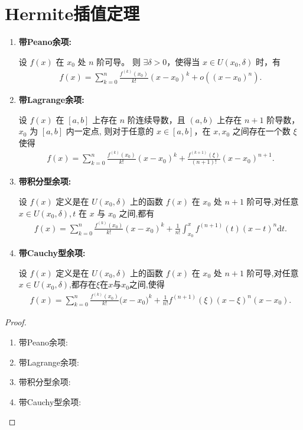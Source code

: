 \documentclass[../../main.tex]{subfiles}
\begin{document}
\section{Hermite插值定理}

\begin{theorem}[Taylor定理]\label{theorem:带各种余项的Taylor公式}
\begin{enumerate}[(1)]
\item \textbf{带Peano余项:}

设 $f(x)$ 在 $x_0$ 处 $n$ 阶可导。
则 $\exists \delta > 0$，使得当 $x \in U(x_0, \delta)$ 时，有
\begin{align*}
f(x) = \sum_{k=0}^{n} \frac{f^{(k)}(x_0)}{k!} (x - x_0)^k + o((x - x_0)^n).
\end{align*}

\item \textbf{带Lagrange余项:}

设 $f(x)$ 在 $[a, b]$ 上存在 $n$ 阶连续导数，且 $(a, b)$ 上存在 $n + 1$ 阶导数，$x_0$ 为 $[a, b]$ 内一定点,
则对于任意的 $x \in [a, b]$，在 $x, x_0$ 之间存在一个数 $\xi$ 使得
\begin{align*}
f(x) = \sum_{k=0}^{n} \frac{f^{(k)}(x_0)}{k!} (x - x_0)^k + \frac{f^{(k+1)}(\xi)}{(n + 1)!} (x - x_0)^{n+1}.
\end{align*}

\item \textbf{带积分型余项:}

设 $f(x)$ 定义是在 $U(x_0, \delta)$ 上的函数 $f(x)$ 在 $x_0$ 处 $n + 1$ 阶可导,对任意$x\in U(x_0, \delta)$,$\,t$ 在 $x$ 与 $x_0$ 之间,都有
\begin{align*}
f(x) = \sum_{k=0}^{n} \frac{f^{(k)}(x_0)}{k!} (x - x_0)^k + \frac{1}{n!} \int_{x_0}^{x} f^{(n+1)}(t) (x - t)^n \mathrm{d}t.
\end{align*}

\item \textbf{带Cauchy型余项:}

设 $f(x)$ 定义是在 $U(x_0, \delta)$ 上的函数 $f(x)$ 在 $x_0$ 处 $n + 1$ 阶可导,对任意$x\in U(x_0, \delta)$,都存在$\xi$在$x$与$x_0$之间,使得
\begin{align*}
f(x)=\sum_{k=0}^n{\frac{f^{(k)}(x_0)}{k!}(x}-x_0)^k+\frac{1}{n!}f^{\left( n+1 \right)}\left( \xi \right) \left( x-\xi \right) ^n\left( x-x_0 \right) .
\end{align*}
\end{enumerate}
\end{theorem}
\begin{proof}
\begin{enumerate}[(1)]
\item {\heiti 带Peano余项:}



\item  {\heiti 带Lagrange余项:}



\item {\heiti 带积分型余项:}



\item {\heiti 带Cauchy型余项:}


\end{enumerate}

\end{proof}
\end{document}
